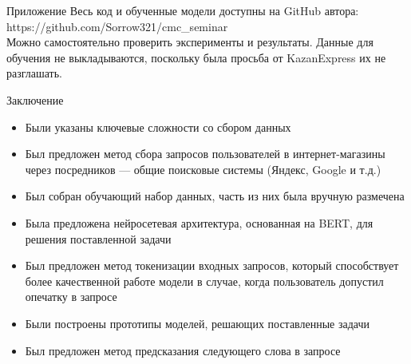 \begin{frame}{Приложение}
Весь код и обученные модели доступны на GitHub автора: https://github.com/Sorrow321/cmc\_seminar\\

Можно самостоятельно проверить эксперименты и результаты. Данные для обучения не выкладываются, поскольку была просьба от KazanExpress их не разглашать.
\end{frame}

\begin{frame}{Заключение}
\begin{itemize}
    \item Были указаны ключевые сложности со сбором данных
    \item Был предложен метод сбора запросов пользователей в интернет-магазины через посредников --- общие поисковые системы (Яндекс, Google и т.д.)
    \item Был собран обучающий набор данных, часть из них была вручную размечена
    \item Была предложена нейросетевая архитектура, основанная на BERT, для решения поставленной задачи
    \item Был предложен метод токенизации входных запросов, который способствует более качественной работе модели в случае, когда пользователь допустил опечатку в запросе
    \item Были построены прототипы моделей, решающих поставленные задачи
    \item Был предложен метод предсказания следующего слова в запросе
\end{itemize}
\end{frame}